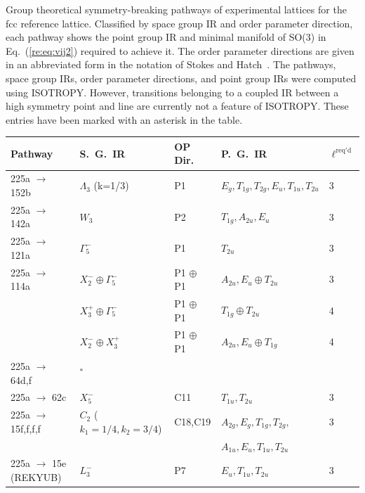 \documentclass[preprint]{iucr}              %
\begin{document}
\begin{table}
{Group theoretical symmetry-breaking pathways of experimental lattices
for the fcc reference lattice. Classified by space group IR and order
parameter direction, each pathway shows the point group IR and
minimal manifold of SO(3) in Eq.~(\ref{re:eq:vij2}) required to
achieve it.  The order parameter directions are given in an abbreviated form in the
notation of Stokes and
Hatch~\cite{Stokes02a}. The pathways, space
group IRs, order parameter directions, and point group IRs were computed using ISOTROPY.
However, transitions belonging to a coupled IR between a high symmetry point and line
are currently not a feature of ISOTROPY.  These entries have been marked with an asterisk in
the table.} \label{pathwaysFCC}\scriptsize
\begin{tabular}{lllll}\hline
Pathway & S.~G.~IR & OP Dir. & P.~G.~IR & $\ell^{\mathrm{req'd}}$  \\
\hline
225a $\rightarrow$ 152b & $\Lambda_3$ (k=1/3) &  P1 & $E_g,T_{1g},T_{2g},E_u,T_{1u},T_{2u}$ & 3 \\
225a $\rightarrow$ 142a & $W_3$ & P2 & $T_{1g},A_{2u},E_{u}$ & 3 \\

225a $\rightarrow$ 121a & $\Gamma_5^-$ & P1 & $T_{2u}$ & 3 \\

225a $\rightarrow$ 114a & $X_2^-\oplus \Gamma_5^-$ & P1 $\oplus$ P1 & $A_{2u},E_u \oplus
T_{2u}$ & 3 \\
& $X_3^+\oplus \Gamma_5^-$ &
P1 $\oplus$ P1 & $T_{1g} \oplus T_{2u}$ & 4 \\
& $X_2^- \oplus X_3^+$ & P1 $\oplus$ P1 & $A_{2u},E_{u} \oplus
T_{1g}$ & 4 \\

225a $\rightarrow$ 64d,f & $^*$\\

225a $\rightarrow$ 62c & $X_5^-$ & C11 & $T_{1u},T_{2u}$ & 3 \\

225a $\rightarrow$ 15f,f,f,f & $C_2$ ($k_1=1/4,k_2=3/4$) & C18,C19 & $A_{2g},E_g,T_{1g},T_{2g},$ & 3 \\
&  & & $A_{1u},E_u,T_{1u},T_{2u}$\\

225a $\rightarrow$ 15e (REKYUB) & $L_3^-$ & P7 &
$E_u,T_{1u},T_{2u}$ & 3 \\


\end{tabular}
\end{table}
\end{document}
